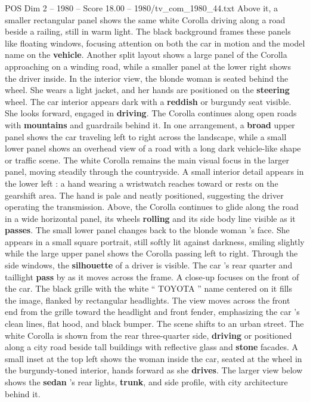 \begin{textsample}{POS Dim 2 – 1980 – Score 18.00 – 1980/tv\_com\_1980\_44.txt}
Above it, a smaller rectangular panel shows the same white Corolla driving along a road beside a railing, still in warm light.
The black background frames these panels like floating windows, focusing attention on both the car in motion and the model name on the \textbf{vehicle}.
Another split layout shows a large panel of the Corolla approaching on a winding road, while a smaller panel at the lower right shows the driver inside.
In the interior view, the blonde woman is seated behind the wheel.
She wears a light jacket, and her hands are positioned on the \textbf{steering} wheel.
The car interior appears dark with a \textbf{reddish} or burgundy seat visible.
She looks forward, engaged in \textbf{driving}.
The Corolla continues along open roads with \textbf{mountains} and guardrails behind it.
In one arrangement, a \textbf{broad} upper panel shows the car traveling left to right across the landscape, while a small lower panel shows an overhead view of a road with a long dark vehicle-like shape or traffic scene.
The white Corolla remains the main visual focus in the larger panel, moving steadily through the countryside.
A small interior detail appears in the lower left : a hand wearing a wristwatch reaches toward or rests on the gearshift area.
The hand is pale and neatly positioned, suggesting the driver operating the transmission.
Above, the Corolla continues to glide along the road in a wide horizontal panel, its wheels \textbf{rolling} and its side body line visible as it \textbf{passes}.
The small lower panel changes back to the blonde woman ’s face.
She appears in a small square portrait, still softly lit against darkness, smiling slightly while the large upper panel shows the Corolla passing left to right.
Through the side windows, the \textbf{silhouette} of a driver is visible.
The car ’s rear quarter and taillight \textbf{pass} by as it moves across the frame.
A close-up focuses on the front of the car.
The black grille with the white “ TOYOTA ” name centered on it fills the image, flanked by rectangular headlights.
The view moves across the front end from the grille toward the headlight and front fender, emphasizing the car ’s clean lines, flat hood, and black bumper.
The scene shifts to an urban street.
The white Corolla is shown from the rear three-quarter side, \textbf{driving} or positioned along a city road beside tall buildings with reflective glass and \textbf{stone} facades.
A small inset at the top left shows the woman inside the car, seated at the wheel in the burgundy-toned interior, hands forward as she \textbf{drives}.
The larger view below shows the \textbf{sedan} ’s rear lights, \textbf{trunk}, and side profile, with city architecture behind it.

\end{textsample}
